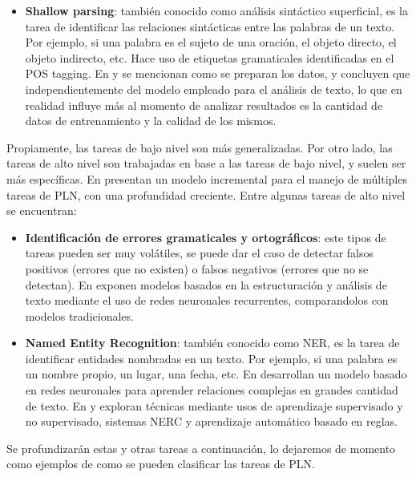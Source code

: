 \documentclass[conference]{IEEEtran}
\begin{document}
\begin{itemize}
  \item \textbf{Shallow parsing}: también conocido como análisis sintáctico superficial, es la tarea de identificar las relaciones sintácticas entre las palabras de un texto. Por ejemplo, si una palabra es el sujeto de una oración, el objeto directo, el objeto indirecto, etc. Hace uso de etiquetas gramaticales identificadas en el POS tagging. En \cite{b10} y \cite{b11} se mencionan como se preparan los datos, y concluyen que independientemente del modelo empleado para el análisis de texto, lo que en realidad influye más al momento de analizar resultados es la cantidad de datos de entrenamiento y la calidad de los mismos.
\end{itemize}
Propiamente, las tareas de bajo nivel son más generalizadas. Por otro lado, las tareas de alto nivel son trabajadas en base a las tareas de bajo nivel, y suelen ser más específicas. En \cite{b12} presentan un modelo incremental para el manejo de múltiples tareas de PLN, con una profundidad creciente. Entre algunas tareas de alto nivel se encuentran:
\begin{itemize}
  \item \textbf{Identificación de errores gramaticales y ortográficos}: este tipos de tareas pueden ser muy volátiles, se puede dar el caso de detectar falsos positivos (errores que no existen) o falsos negativos (errores que no se detectan).  En \cite{b13} \cite{b14} exponen modelos basados en la estructuración y análisis de texto mediante el uso de redes neuronales recurrentes, comparandolos con modelos tradicionales.
  \item \textbf{Named Entity Recognition}: también conocido como NER, es la tarea de identificar entidades nombradas en un texto. Por ejemplo, si una palabra es un nombre propio, un lugar, una fecha, etc. En \cite{b15} desarrollan un modelo basado en redes neuronales para aprender relaciones complejas en grandes cantidad de texto. En \cite{b16} y \cite{b17} exploran técnicas mediante usos de aprendizaje supervisado y no supervisado, sistemas NERC y aprendizaje automático basado en reglas.
\end{itemize}
Se profundizarán estas y otras tareas a continuación, lo dejaremos de momento como ejemplos de como se pueden clasificar las tareas de PLN.
\end{document}
